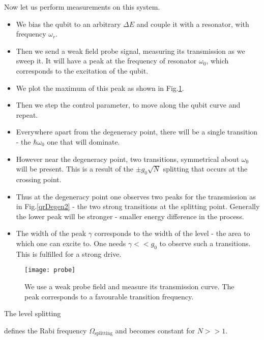 Now let us perform measurements on this system.

\begin{itemize}
\item We  bias the qubit to  an arbitrary $ \Delta  E $ and couple  it with a
  resonator, with frequency $ \omega_r $.
\item Then we send a weak field probe signal, measuring its transmission
  as we  sweep it.  It will have  a peak at  the frequency  of resonator
  $ \omega_0 $, which corresponds to the excitation of the qubit.
\item We plot the maximum of this peak as shown in Fig.\ref{qrProbe}.
\item Then we step the control  parameter, to move along the qubit curve
  and repeat.
\item Everywhere apart from the degeneracy point, there will be a single
  transition - the $ \hbar\omega_0 $ one that will dominate.
\item However  near the  degeneracy point, two  transitions, symmetrical
  about  $  \omega_0  $ will  be  present.   This  is  a result  of  the
  $ \pm g_0\sqrt{N} $ splitting that occurs at the crossing point.
\item  Thus at  the  degeneracy point  one observes  two  peaks for  the
  transmission as in Fig.\ref{qrDegen2} -  the two strong transitions at
  the  splitting point.   Generally the  lower peak  will be  stronger -
  smaller energy difference in the process.
\item The width of the peak $ \gamma  $ corresponds to the width of the level
  - the area to  which one can excite to.  One needs  $ \gamma<<g_0 $ to
  observe such a transitions.  This is fulfilled for a strong drive.
\end{itemize}

\begin{figure}
  \texttt{[image: probe]}
  \caption{We use a weak probe field and measure its transmission curve.
    The     peak    corresponds     to    a     favourable    transition
    frequency. \label{qrProbe}}
\end{figure}

{\LARGE The level splitting


  \noindent defines  the Rabi frequency $  \Omega_\text{splitting} $ and
  becomes constant for $N>>1$.}


